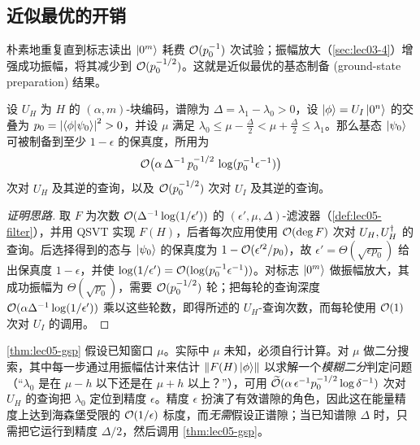 \subsection*{近似最优的开销}

朴素地重复直到标志读出 $\ket{0^m}$ 耗费 $\mathcal{O}(p_0^{-1})$ 次试验；振幅放大（\cref{sec:lec03-4}）增强成功振幅，将其减少到 $\mathcal{O}(p_0^{-1/2})$。这就是近似最优的基态制备 (ground-state preparation) 结果。

\begin{theorem}[已知能量窗口下的基态制备]
\label{thm:lec05-gsp}
设 $U_H$ 为 $H$ 的 $(\alpha,m)$-块编码，谱隙为 $\Delta=\lambda_1-\lambda_0>0$，设 $\ket{\phi}=U_I\ket{0^n}$ 的交叠为 $p_0=\left\lvert \braket{\phi|\psi_0} \right\rvert^2>0$，并设 $\mu$ 满足
$\lambda_0\le\mu-\tfrac{\Delta}{2}<\mu+\tfrac{\Delta}{2}\le\lambda_1$。那么基态 $\ket{\psi_0}$ 可被制备到至少 $1-\epsilon$ 的保真度，所用为
\[
  \mathcal{O}\bigl(\alpha\,\Delta^{-1}\,p_0^{-1/2}\,\log(p_0^{-1}\epsilon^{-1})\bigr)
\]
次对 $U_H$ 及其逆的查询，以及 $\mathcal{O}(p_0^{-1/2})$ 次对 $U_I$ 及其逆的查询。
\end{theorem}

\begin{proof}[证明思路]
取 $F$ 为次数 $\mathcal{O}(\Delta^{-1}\log(1/\epsilon'))$ 的 $(\epsilon',\mu,\Delta)$-滤波器（\cref{def:lec05-filter}），并用 QSVT 实现 $F(H)$，后者每次应用使用 $\mathcal{O}(\deg F)$ 次对 $U_H,U_H^{\dagger}$ 的查询。后选择得到的态与 $\ket{\psi_0}$ 的保真度为 $1-\mathcal{O}(\epsilon'^2/p_0)$，故 $\epsilon'=\Theta(\sqrt{\epsilon p_0})$ 给出保真度 $1-\epsilon$，并使 $\log(1/\epsilon')=\mathcal{O}(\log(p_0^{-1}\epsilon^{-1}))$。对标志 $\ket{0^m}$ 做振幅放大，其成功振幅为 $\Theta(\sqrt{p_0})$，需要 $\mathcal{O}(p_0^{-1/2})$ 轮；把每轮的查询深度 $\mathcal{O}(\alpha\Delta^{-1}\log(1/\epsilon'))$ 乘以这些轮数，即得所述的 $U_H$-查询次数，而每轮使用 $\mathcal{O}(1)$ 次对 $U_I$ 的调用。
\end{proof}

\begin{remark}[去掉先验的能量估计]
\label{rem:lec05-bisection}
\cref{thm:lec05-gsp} 假设已知窗口 $\mu$。实际中 $\mu$ 未知，必须自行计算。对 $\mu$ 做二分搜索，其中每一步通过用振幅估计来估计 $\left\lVert F(H)\ket{\phi} \right\rVert$ 以求解一个\emph{模糊二分}判定问题（``$\lambda_0$ 是在 $\mu-h$ 以下还是在 $\mu+h$ 以上？''），可用
$\widetilde{\mathcal{O}}(\alpha\,\epsilon^{-1}p_0^{-1/2}\log\delta^{-1})$ 次对 $U_H$ 的查询把 $\lambda_0$ 定位到精度 $\epsilon$。精度 $\epsilon$ 扮演了有效谱隙的角色，因此这在能量精度上达到海森堡受限的 $\mathcal{O}(1/\epsilon)$ 标度，而\emph{无需}假设正谱隙；当已知谱隙 $\Delta$ 时，只需把它运行到精度 $\Delta/2$，然后调用 \cref{thm:lec05-gsp}。
\end{remark}

